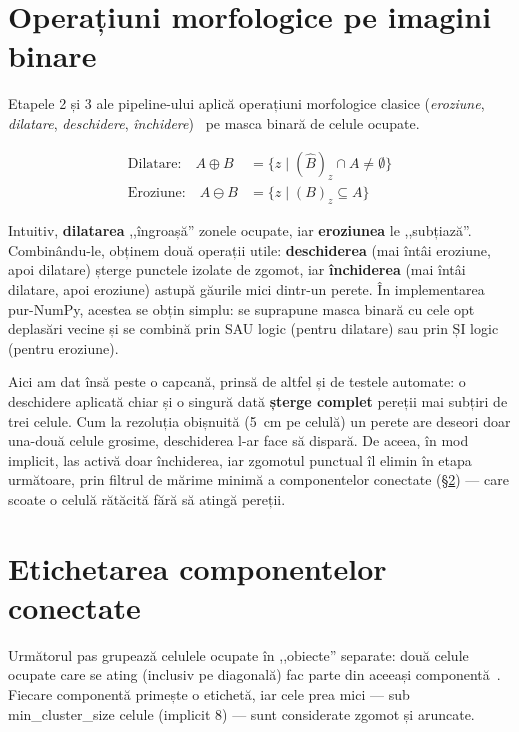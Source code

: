 \documentclass[a4paper,12pt,twoside,openany]{report}
\renewcommand{\texttt}[1]{\textnormal{#1}}
\begin{document}
\section{Operațiuni morfologice pe imagini binare}
\label{sec:morfologie}

Etapele 2 și 3 ale pipeline-ului aplică operațiuni morfologice clasice
(\textit{eroziune}, \textit{dilatare}, \textit{deschidere},
\textit{închidere})~\cite{serra1982morpho, soille2003morpho} pe masca
binară de celule ocupate.

\begin{align}
    \text{Dilatare:}\quad A \oplus B &= \{ z \mid (\hat{B})_z \cap A \neq \emptyset \} \label{eq:dilation}\\
    \text{Eroziune:}\quad A \ominus B &= \{ z \mid (B)_z \subseteq A \} \label{eq:erosion}
\end{align}

Intuitiv, \textbf{dilatarea} ,,îngroașă'' zonele ocupate, iar
\textbf{eroziunea} le ,,subțiază''. Combinându-le, obținem două operații utile:
\textbf{deschiderea} (mai întâi eroziune, apoi dilatare) șterge punctele
izolate de zgomot, iar \textbf{închiderea} (mai întâi dilatare, apoi eroziune)
astupă găurile mici dintr-un perete. În implementarea pur-NumPy, acestea se
obțin simplu: se suprapune masca binară cu cele opt deplasări vecine și se
combină prin SAU logic (pentru dilatare) sau prin ȘI logic (pentru eroziune).

Aici am dat însă peste o capcană, prinsă de altfel și de testele automate: o
deschidere aplicată chiar și o singură dată \textbf{șterge complet} pereții
mai subțiri de trei celule. Cum la rezoluția obișnuită (\SI{5}{\centi\meter}
pe celulă) un perete are deseori doar una-două celule grosime, deschiderea
l-ar face să dispară. De aceea, în mod implicit, las activă doar închiderea, iar
zgomotul punctual îl elimin în etapa următoare, prin filtrul de mărime minimă a
componentelor conectate (§\ref{sec:cc}) — care scoate o celulă rătăcită fără
să atingă pereții.

\section{Etichetarea componentelor conectate}
\label{sec:cc}

Următorul pas grupează celulele ocupate în ,,obiecte'' separate: două celule
ocupate care se ating (inclusiv pe diagonală) fac parte din aceeași
componentă~\cite{rosenfeldpfaltz1966}. Fiecare componentă primește o etichetă,
iar cele prea mici — sub \texttt{min\_cluster\_size} celule (implicit 8) —
sunt considerate zgomot și aruncate.
\end{document}
